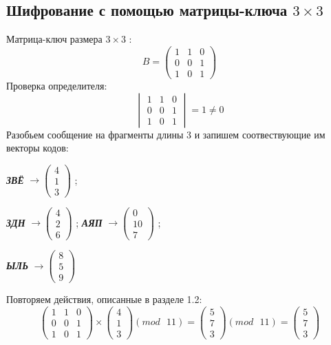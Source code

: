 \documentclass[a5paper, 10pt]{article}
\theoremstyle{definition}
\theoremstyle{plain}
\theoremstyle{remark}
\begin{document}
\subsection{Шифрование с помощью матрицы-ключа $3 \times 3$}
Матрица-ключ размера  $3 \times 3$ :
\begin{equation}
B =
\begin{pmatrix}
1 & 1 & 0 \\
0 & 0 & 1\\
1 & 0 & 1
\end{pmatrix}
\end{equation}
Проверка определителя:
\begin{equation}
\begin{vmatrix}
1 & 1 & 0 \\
0 & 0 & 1\\
1 & 0 & 1
\end{vmatrix}
= 1 \neq 0
\end{equation}
Разобьем сообщение на фрагменты длины 3 и запишем соотвествующие им векторы кодов:
\begin{center}
\textbf{\textit{ЗВЁ}} $\to \begin{pmatrix}
 4\\
1\\
3
\end{pmatrix}$ ;

\textbf{\textit{ЗДН}}  $\to \begin{pmatrix}
4\\
 2\\
6
\end{pmatrix}$ ;
\textbf{\textit{АЯП}}  $\to \begin{pmatrix}
 0\\
10\\
7
\end{pmatrix}$ ;

\textbf{\textit{ЫЛЬ}}  $\to \begin{pmatrix}
8\\
 5\\
9
\end{pmatrix}$ \\
\end{center}
Повторяем действия, описанные в разделе 1.2:
\begin{equation}
\begin{pmatrix}
 1 & 1 & 0 \\
0 & 0 & 1\\
1 & 0 & 1
\end{pmatrix}
 \times
\begin{pmatrix}
 4\\
1\\
3
\end{pmatrix}
(mod \text{ }11)
= 
\begin{pmatrix}
 5\\
7\\
3
\end{pmatrix}
(mod \text{ }11)
= \begin{pmatrix}
5 \\
7\\
3
\end{pmatrix}
\end{equation}
\end{document}
